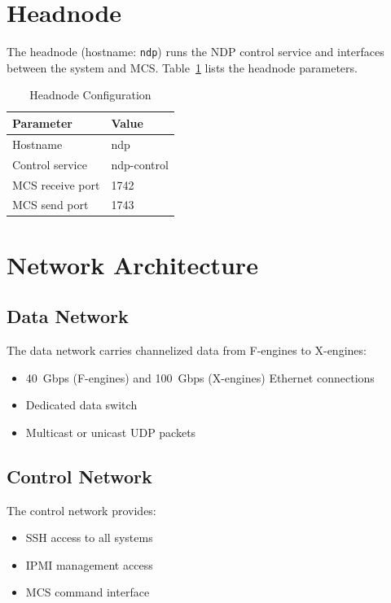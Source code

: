 \section{Headnode}

The headnode (hostname: \texttt{ndp}) runs the NDP control service and interfaces between the system and MCS.  Table~\ref{tab:headnode-config} lists the headnode parameters.

\begin{table}[htbp]
    \centering
    \caption{Headnode Configuration}
    \label{tab:headnode-config}
    \begin{tabular}{ll}
        \toprule
        \textbf{Parameter} & \textbf{Value} \\
        \midrule
        Hostname & ndp \\
        Control service & ndp-control \\
        MCS receive port & 1742 \\
        MCS send port & 1743 \\
        \bottomrule
    \end{tabular}
\end{table}

\section{Network Architecture}

\subsection{Data Network}

The data network carries channelized data from F-engines to X-engines:
\begin{itemize}
    \item 40~Gbps (F-engines) and 100~Gbps (X-engines) Ethernet connections
    \item Dedicated data switch
    \item Multicast or unicast UDP packets
\end{itemize}

\subsection{Control Network}

The control network provides:
\begin{itemize}
    \item SSH access to all systems
    \item IPMI management access
    \item MCS command interface
\end{itemize}

